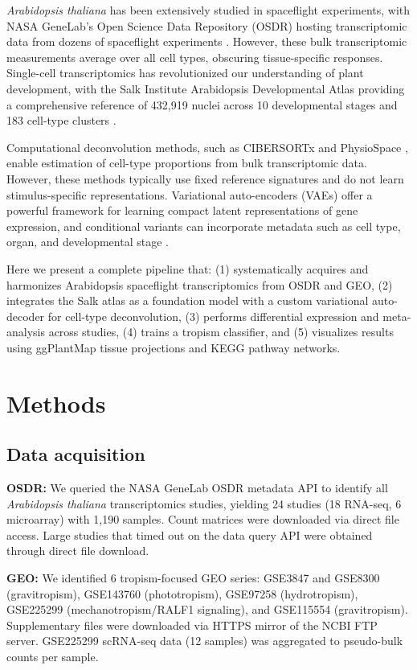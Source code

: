 \documentclass[pdflatex,sn-nature]{sn-jnl}
\begin{document}
\textit{Arabidopsis thaliana} has been extensively studied in spaceflight
experiments, with NASA GeneLab's Open Science Data Repository (OSDR) hosting
transcriptomic data from dozens of spaceflight experiments \cite{osdr_api}.
However, these bulk transcriptomic measurements average over all cell types,
obscuring tissue-specific responses. Single-cell transcriptomics has revolutionized
our understanding of plant development, with the Salk Institute Arabidopsis
Developmental Atlas providing a comprehensive reference of 432{,}919 nuclei across
10 developmental stages and 183 cell-type clusters \cite{salk_atlas}.

Computational deconvolution methods, such as CIBERSORTx \cite{newman2019} and
PhysioSpace \cite{schiller2021}, enable estimation of cell-type proportions from
bulk transcriptomic data. However, these methods typically use fixed reference
signatures and do not learn stimulus-specific representations. Variational
auto-encoders (VAEs) offer a powerful framework for learning compact latent
representations of gene expression, and conditional variants can incorporate
metadata such as cell type, organ, and developmental stage \cite{lopez2018}.

Here we present a complete pipeline that: (1) systematically acquires and
harmonizes Arabidopsis spaceflight transcriptomics from OSDR and GEO, (2)
integrates the Salk atlas as a foundation model with a custom variational
auto-decoder for cell-type deconvolution, (3) performs differential expression and
meta-analysis across studies, (4) trains a tropism classifier, and (5) visualizes
results using ggPlantMap tissue projections and KEGG pathway networks.

\section{Methods}\label{sec:methods}

\subsection{Data acquisition}
\textbf{OSDR:} We queried the NASA GeneLab OSDR metadata API to identify all
\textit{Arabidopsis thaliana} transcriptomics studies, yielding 24 studies (18
RNA-seq, 6 microarray) with 1{,}190 samples. Count matrices were downloaded via
direct file access. Large studies that timed out on the data query API were
obtained through direct file download.

\textbf{GEO:} We identified 6 tropism-focused GEO series: GSE3847 and GSE8300
(gravitropism), GSE143760 (phototropism), GSE97258 (hydrotropism), GSE225299
(mechanotropism/RALF1 signaling), and GSE115554 (gravitropism). Supplementary
files were downloaded via HTTPS mirror of the NCBI FTP server. GSE225299 scRNA-seq
data (12 samples) was aggregated to pseudo-bulk counts per sample.
\end{document}
